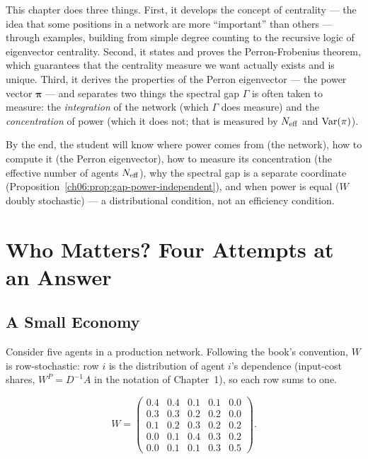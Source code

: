 \documentclass[../structural_economics_book.tex]{subfiles}
\begin{document}
This chapter does three things. First, it develops the concept of centrality --- the idea that some positions in a network are more ``important'' than others --- through examples, building from simple degree counting to the recursive logic of eigenvector centrality. Second, it states and proves the Perron-Frobenius theorem, which guarantees that the centrality measure we want actually exists and is unique. Third, it derives the properties of the Perron eigenvector --- the power vector $\boldsymbol{\pi}$ --- and separates two things the spectral gap $\Gamma$ is often taken to measure: the \textit{integration} of the network (which $\Gamma$ does measure) and the \textit{concentration} of power (which it does not; that is measured by $N_{\text{eff}}$ and $\operatorname{Var}(\pi)$).

By the end, the student will know where power comes from (the network), how to compute it (the Perron eigenvector), how to measure its concentration (the effective number of agents $N_{\text{eff}}$), why the spectral gap is a separate coordinate (Proposition~\ref{ch06:prop:gap-power-independent}), and when power is equal ($W$ doubly stochastic) --- a distributional condition, not an efficiency condition.


\section{Who Matters? Four Attempts at an Answer}
\label{ch06:sec:who_matters}

\subsection{A Small Economy}

Consider five agents in a production network. Following the book's convention, $W$ is row-stochastic: row $i$ is the distribution of agent $i$'s dependence (input-cost shares, $W^P = D^{-1}A$ in the notation of Chapter~1), so each row sums to one. \illustrative

\begin{equation}\label{ch06:eq:W5}
W = \begin{pmatrix}
0.4 & 0.4 & 0.1 & 0.1 & 0.0 \\
0.3 & 0.3 & 0.2 & 0.2 & 0.0 \\
0.1 & 0.2 & 0.3 & 0.2 & 0.2 \\
0.0 & 0.1 & 0.4 & 0.3 & 0.2 \\
0.0 & 0.1 & 0.1 & 0.3 & 0.5
\end{pmatrix}.
\end{equation}
\end{document}
